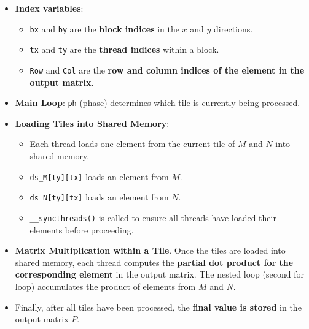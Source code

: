 \begin{itemize}
    \item \textbf{Index variables}:
    \begin{itemize}
        \item \texttt{bx} and \texttt{by} are the \textbf{block indices} in the $x$ and $y$ directions.
        \item \texttt{tx} and \texttt{ty} are the \textbf{thread indices} within a block.
        \item \texttt{Row} and \texttt{Col} are the \textbf{row and column indices of the element in the output matrix}.
    \end{itemize}

    \item \textbf{Main Loop}: \texttt{ph} (phase) determines which tile is currently being processed.
    
    \item \textbf{Loading Tiles into Shared Memory}:
    \begin{itemize}
        \item Each thread loads one element from the current tile of $M$ and $N$ into shared memory.
        \item \texttt{ds\_M[ty][tx]} loads an element from $M$.
        \item \texttt{ds\_N[ty][tx]} loads an element from $N$.
        \item \texttt{\_\_syncthreads()} is called to ensure all threads have loaded their elements before proceeding.
    \end{itemize}

    \item \textbf{Matrix Multiplication within a Tile}. Once the tiles are loaded into shared memory, each thread computes the \textbf{partial dot product for the corresponding element} in the output matrix. The nested loop (second for loop) accumulates the product of elements from $M$ and $N$.

    \item Finally, after all tiles have been processed, the \textbf{final value is stored} in the output matrix $P$.
\end{itemize}

